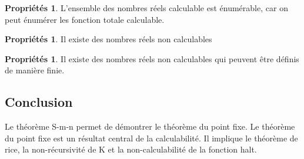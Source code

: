 \documentclass[11pt,a4paper]{article}
\theoremstyle{definition}
\newtheorem{myprop}[mydef]{Propriétés}
\begin{document}
\begin{myprop}
	L'ensemble des nombres réels calculable est énumérable, car on peut énumérer les 
	fonction totale calculable.	
\end{myprop}

\begin{myprop}
	Il existe des nombres réels non calculables
\end{myprop}

\begin{myprop}
	Il existe des nombres réels non calculables qui peuvent être définis de 
	manière finie.
\end{myprop}


\subsection{Conclusion}
\label{sub:conclusion}
Le théorème S-m-n permet de démontrer le théorème du point fixe.
Le théorème du point fixe est un résultat central de la calculabilité. Il 
implique le théorème de rice, la non-récursivité de K et la non-calculabilité 
de la fonction halt.








\end{document}
